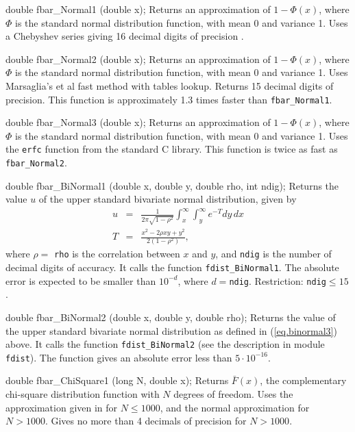 double fbar_Normal1 (double x);
\endcode
  \tab  
  Returns an approximation of $1 - \Phi(x)$, 
  where $\Phi$ is the standard normal distribution function,
  with mean 0 and variance 1. 
  Uses a Chebyshev series giving 16 decimal digits of
  precision \cite{tSCH78a}.
 \endtab
\code


double fbar_Normal2 (double x);
\endcode
  \tab  
  Returns an approximation of $1 - \Phi(x)$,  where $\Phi$ is the standard
  normal distribution function, with mean 0 and variance 1. 
   Uses Marsaglia's et al \cite{rMAR94b} fast method
  with tables lookup. Returns 15 decimal digits of precision.
  This function is approximately 1.3 times faster than {\tt fbar\_Normal1}.
 \endtab
\code


double fbar_Normal3 (double x);
\endcode
  \tab
  Returns an approximation of $1 - \Phi(x)$, 
  where $\Phi$ is the standard normal distribution function,
  with mean 0 and variance 1. 
  Uses the {\tt erfc} function from the standard C library. This function
  is twice as fast as {\tt fbar\_Normal2}.
 \endtab
\code


double fbar_BiNormal1 (double x, double y, double rho, int ndig);
\endcode
  \tab  
  Returns the value $u$ of the upper standard bivariate normal distribution,
  given by
\begin{eqnarray}
     u &=&  \frac{1}{2\pi\sqrt{1 - \rho^2}} \int^{\infty}_x
              \int^{\infty}_y e^{-T} dy\, dx  \label{eq.binormal3} \\[5pt]
     T &=& \frac{x^2 -2\rho x y + y^2}{2(1-\rho^2)}, \nonumber
\end{eqnarray}
  where $\rho = ${ \tt rho} is the correlation between $x$ and $y$, and
 \texttt{ndig} is the number of decimal digits of accuracy.
  It calls the function {\tt fdist\_BiNormal1}. The absolute error
  is expected to be smaller than $10^{-d}$, where $d={}$\texttt{ndig}.
  Restriction: \texttt{ndig}${} \le 15$.
 \endtab
\code


double fbar_BiNormal2 (double x, double y, double rho);
\endcode
  \tab  
  Returns the value of the upper standard bivariate normal distribution as 
  defined in (\ref{eq.binormal3}) above.
  It calls the function {\tt fdist\_BiNormal2} (see the description in
   module {\tt fdist}). The function gives
   an absolute error less than $5 \cdot 10^{-16}$. 
 \endtab
\code


double fbar_ChiSquare1 (long N, double x);
\endcode
  \tab  
    Returns $\bar F(x)$, the complementary
   chi-square distribution function with
   $N$ degrees of freedom.
  Uses the approximation given in \cite[p.116]{tKEN80a} for $N\le 1000$,
  and the normal approximation for $N > 1000$. Gives no more than 4
  decimals of precision for $N > 1000$.
 \endtab
\code


